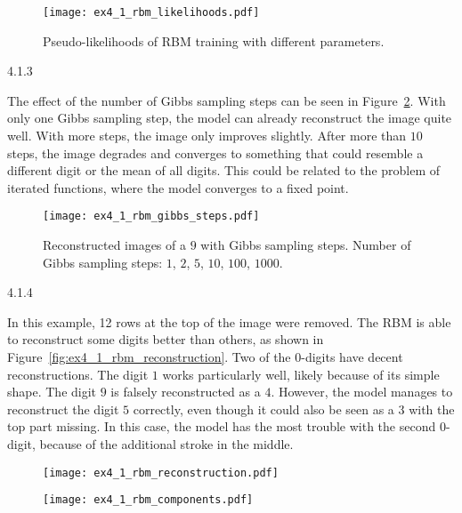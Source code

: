 \begin{figure}[ht]
  \centering
  \texttt{[image: ex4\_1\_rbm\_likelihoods.pdf]}
  \caption{Pseudo-likelihoods of RBM training with different parameters.}
  \label{fig:ex4_1_rbm_likelihoods}
\end{figure}



\begin{task}{4.1.3}
\end{task}

The effect of the number of Gibbs sampling steps can be seen in
Figure~\ref{fig:ex4_1_rbm_gibbs_steps}. With only one Gibbs sampling step, the model can already
reconstruct the image quite well. With more steps, the image only improves slightly. After more than
$10$ steps, the image degrades and converges to something that could resemble a different digit or
the mean of all digits. This could be related to the problem of iterated functions, where the model
converges to a fixed point.

\begin{figure}[ht]
  \centering
  \texttt{[image: ex4\_1\_rbm\_gibbs\_steps.pdf]}
  \caption{Reconstructed images of a $9$ with Gibbs sampling steps. Number of Gibbs sampling steps:
    $1$, $2$, $5$, $10$, $100$, $1000$.}
  \label{fig:ex4_1_rbm_gibbs_steps}
\end{figure}



\begin{task}{4.1.4}
\end{task}

In this example, 12 rows at the top of the image were removed. The RBM is able to reconstruct some
digits better than others, as shown in Figure~\ref{fig:ex4_1_rbm_reconstruction}. Two of the
$0$-digits have decent reconstructions. The digit $1$ works particularly well, likely because of its
simple shape. The digit $9$ is falsely reconstructed as a $4$. However, the model manages to
reconstruct the digit $5$ correctly, even though it could also be seen as a $3$ with the top part
missing. In this case, the model has the most trouble with the second $0$-digit, because of the
additional stroke in the middle.

\begin{figure}[ht!]
  \centering
  \begin{minipage}{0.6\textwidth}
    \centering
    \texttt{[image: ex4\_1\_rbm\_reconstruction.pdf]}
    \label{fig:ex4_1_rbm_reconstruction}
  \end{minipage}
  \begin{minipage}{0.39\textwidth}
    \centering
    \texttt{[image: ex4\_1\_rbm\_components.pdf]}
    \label{fig:ex4_1_rbm_components}
  \end{minipage}
\end{figure}



